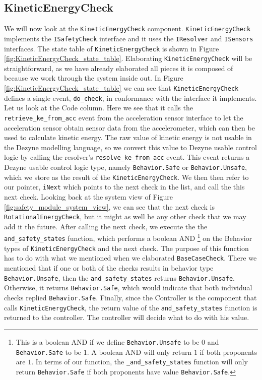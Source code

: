 \documentclass[12pt]{scrreprt}
\begin{document}
\subsection{KineticEnergyCheck}
We will now look at the \texttt{KineticEnergyCheck} component. \texttt{KineticEnergyCheck} implements the \texttt{ISafetyCheck} interface and it uses the \texttt{IResolver} and \texttt{ISensors} interfaces. The state table of \texttt{KineticEnergyCheck} is shown in Figure \ref{fig:KineticEnergyCheck_state_table}. Elaborating \texttt{KineticEnergyCheck} will be straightforward, as we have already elaborated all pieces it is composed of because we work through the system inside out. In Figure \ref{fig:KineticEnergyCheck_state_table} we can see that \texttt{KineticEnergyCheck} defines a single event, \texttt{do\_check}, in conformance with the interface it implements. Let us look at the Code column. Here we see that it calls the \texttt{retrieve\_ke\_from\_acc} event from the acceleration sensor interface to let the acceleration sensor obtain sensor data from the accelerometer, which can then be used to calculate kinetic energy. The raw value of kinetic energy is not usable in the Dezyne modelling language, so we convert this value to Dezyne usable control logic by calling the resolver's \texttt{resolve\_ke\_from\_acc} event. This event returns a Dezyne usable control logic type, namely \texttt{Behavior.Safe} or \texttt{Behavior.Unsafe}, which we store as the result of the \texttt{KineticEnergyCheck}. We then then refer to our pointer, \texttt{iNext} which points to the next check in the list, and call the this next check. Looking back at the system view of Figure \ref{fig:safety_module_system_view}, we can see that the next check is \texttt{RotationalEnergyCheck}, but it might as well be any other check that we may add it the future. After calling the next check, we execute the the \texttt{and\_safety\_states}  function, which performs a boolean AND \footnote{This is a boolean AND if we define \texttt{Behavior.Unsafe} to be $0$ and \texttt{Behavior.Safe} to be $1$. A boolean AND will only return $1$ if both proponents are $1$. In terms of our function, the \texttt{\_and\_safety\_states} function will only return \texttt{Behavior.Safe} if both proponents have value \texttt{Behavior.Safe}.} on the Behavior types of \texttt{KineticEnergyCheck} and the next check. The purpose of this function has to do with what we mentioned when we elaborated \texttt{BaseCaseCheck}. There we mentioned that if one or both of the checks results in behavior type \texttt{Behavior.Unsafe}, then the \texttt{and\_safety\_states} returns \texttt{Behavior.Unsafe}. Otherwise, it returns \texttt{Behavior.Safe}, which would indicate that both individual checks replied \texttt{Behavior.Safe}. Finally, since the Controller is the component that calls \texttt{KineticEnergyCheck}, the return value of the \texttt{and\_safety\_states} function is returned to the controller. The controller will decide what to do with his value.
\end{document}
